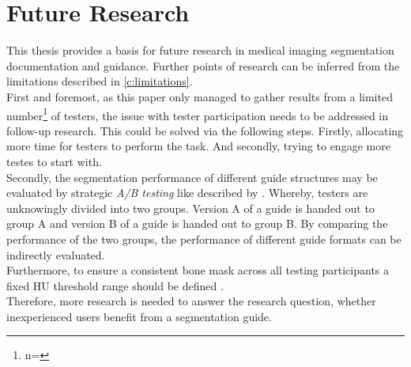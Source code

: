 \section*{Future Research}\label{c:future}
This thesis provides a basis for future research in medical imaging segmentation documentation and guidance.
Further points of research can be inferred from the limitations described in \cref{c:limitations}.\\
First and foremost, as this paper only managed to gather results from a limited number\footnote{n=\numberofTesters} of testers, the issue with tester participation needs to be addressed in follow-up research.
This could be solved via the following steps.
Firstly, allocating more time for testers to perform the task.
And secondly, trying to engage more testes to start with.\\
Secondly, the segmentation performance of different guide structures may be evaluated by strategic \textit{A/B testing} like described by \citeauthor{brataUserExperienceImprovement2020}.
Whereby, testers are unknowingly divided into two groups.
Version A of a guide is handed out to group A and version B of a guide is handed out to group B.
By comparing the performance of the two groups, the performance of different guide formats can be indirectly evaluated.\\
Furthermore, to ensure a consistent bone mask across all testing participants a fixed HU threshold range should be defined \cite{chavezGuidelinesMicroComputed2021}.\\
Therefore, more research is needed to answer the research question, whether inexperienced users benefit from a segmentation guide.
